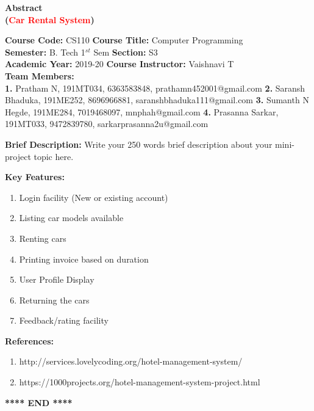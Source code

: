 \documentclass[12pt]{article}
\begin{document}


\begin{center}
    \textbf{\Large{Abstract \\
    (\textcolor{red}{Car Rental System})}}
\end{center}

\noindent 
\textbf{Course Code:} CS110 
\hspace{2in} 
\textbf{Course Title:} Computer Programming \\
\textbf{Semester:} B. Tech 1$^{st}$ Sem 
\hspace{1.6in} 
\textbf{Section:} S3 \\
\textbf{Academic Year:} 2019-20 
\hspace{1.8in} 
\textbf{Course Instructor:} Vaishnavi T \\
\textbf{Team Members:} \\
\textbf{1.} Pratham N, 191MT034, 6363583848, prathamn452001@gmail.com 
\newline
\textbf{2.} Saransh Bhaduka, 191ME252, 8696966881, saranshbhaduka111@gmail.com
\newline
\textbf{3.} Sumanth N Hegde, 191ME284, 7019468097, mnphah@gmail.com
\newline
\textbf{4.} Prasanna Sarkar, 191MT033, 9472839780, sarkarprasanna2u@gmail.com

\vspace{0.25in}

\noindent
\textbf{Brief Description:}
\newline
Write your 250 words brief description about your mini-project topic here.

\noindent
\textbf{Key Features:}
\begin{enumerate}
    \item Login facility (New or existing account)
    \item Listing car models available
    \item Renting cars
    \item Printing invoice based on duration
    \item User Profile Display
    \item Returning the cars
    \item Feedback/rating facility
\end{enumerate}

\noindent
\textbf{References:}
\begin{enumerate}
    \item http://services.lovelycoding.org/hotel-management-system/
    \item https://1000projects.org/hotel-management-system-project.html
\end{enumerate}


\begin{center}
    \textbf{**** END ****}
\end{center}
\end{document}
